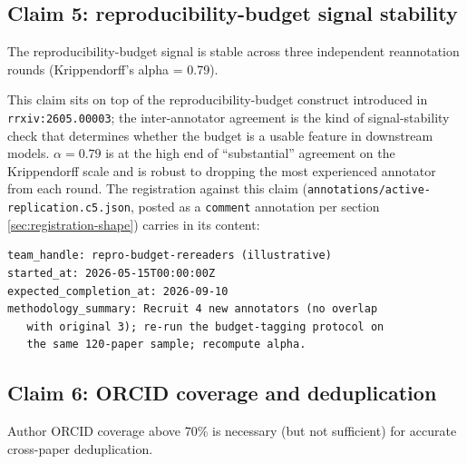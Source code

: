 \documentclass{rrxiv}
\begin{document}
\subsection*{Claim 5: reproducibility-budget signal stability}
\begin{claim}[type=methodological, evidence=experiment, confidence=0.75, rationale={Three reannotation rounds with alpha robust to dropping the most experienced annotator; small annotator pool}, labels={worked-example, inter-annotator}, title={Reproducibility-budget signal stability}]
\label{claim:c5}
The reproducibility-budget signal is stable across three independent reannotation rounds (Krippendorff's alpha = 0.79).
\end{claim}

This claim sits on top of the reproducibility-budget construct introduced in \texttt{rrxiv:2605.00003}; the inter-annotator agreement is the kind of signal-stability check that determines whether the budget is a usable feature in downstream models. $\alpha = 0.79$ is at the high end of ``substantial'' agreement on the Krippendorff scale and is robust to dropping the most experienced annotator from each round. The registration against this claim (\texttt{annotations/active-replication.c5.json}, posted as a \texttt{comment} annotation per section \ref{sec:registration-shape}) carries in its content:

\begin{verbatim}
team_handle: repro-budget-rereaders (illustrative)
started_at: 2026-05-15T00:00:00Z
expected_completion_at: 2026-09-10
methodology_summary: Recruit 4 new annotators (no overlap
   with original 3); re-run the budget-tagging protocol on
   the same 120-paper sample; recompute alpha.
\end{verbatim}

\subsection*{Claim 6: ORCID coverage and deduplication}
\begin{claim}[type=empirical, evidence=observation, confidence=0.6, rationale={Empirical threshold from dedup error decomposition on the demonstration corpus; the exact 70 percent figure is corpus-dependent}, labels={worked-example, identity}, title={ORCID coverage and deduplication}]
\label{claim:c6}
Author ORCID coverage above 70\% is necessary (but not sufficient) for accurate cross-paper deduplication.
\end{claim}
\end{document}
